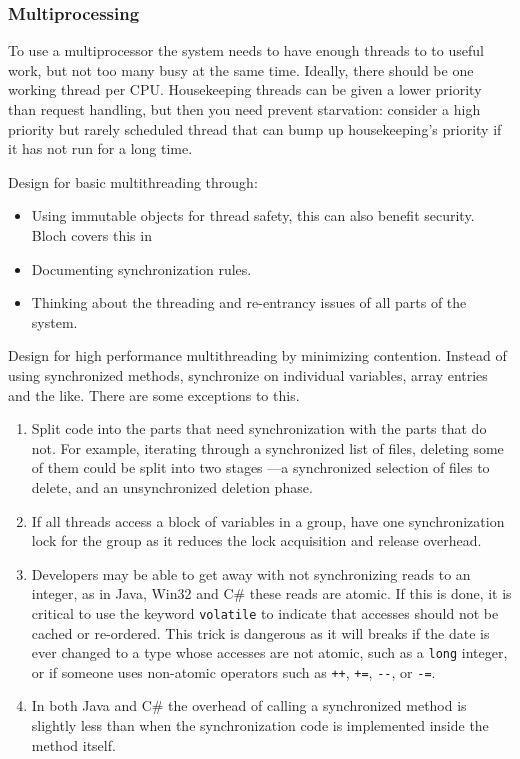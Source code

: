\documentclass[draft]{report}
\begin{document}
\subsubsection{Multiprocessing}

To use a multiprocessor the system needs to have enough threads to to
useful work, but not too many busy at the same time. Ideally, there
should be one working thread per CPU. Housekeeping threads can be given
a lower priority than request handling, but then you need prevent
starvation: consider a high priority but rarely scheduled thread that
can bump up housekeeping's priority if it has not run for a long time.

Design for basic multithreading through:

\begin{itemize}

\item Using immutable objects for thread safety, this can also benefit
security. Bloch covers this in \cite{bloch:effective-java}

\item Documenting synchronization rules.

\item Thinking about the threading and re-entrancy issues of all parts
of the system.

\end{itemize}

Design for high performance multithreading by minimizing contention.
Instead of using synchronized methods, synchronize on individual
variables, array entries and the like. There are some exceptions to
this.

\begin{enumerate}

\item Split code into the parts that need synchronization with the parts
that do not. For example, iterating through a synchronized list of
files, deleting some of them could be split into two stages ---a
synchronized selection of files to delete, and an unsynchronized
deletion phase.

\item If all threads access a block of variables in a group, have one
synchronization lock for the group as it reduces the lock acquisition
and release overhead.

\item Developers may be able to get away with not synchronizing reads to
an integer, as in Java, Win32 and C\# these reads are atomic. If this is
done, it is critical to use the keyword \verb$volatile$ to indicate that
accesses should not be cached or re-ordered. This trick is dangerous as
it will breaks if the date is ever changed to a type whose accesses are
not atomic, such as a \verb$long$ integer, or if someone uses non-atomic
operators such as \verb$++$, \verb$+=$, \verb$--$, or \verb$-=$.

\item In both Java and C\# the overhead of calling a synchronized method
is slightly less than when the synchronization code is implemented
inside the method itself.

\end{enumerate}
\end{document}
